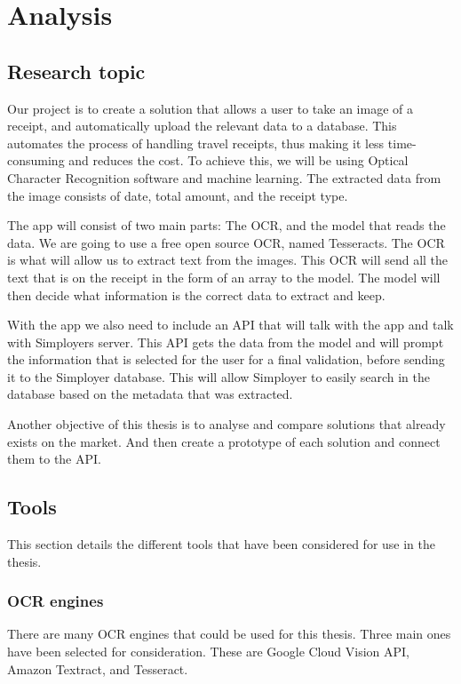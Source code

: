 \cleardoublepage
\chapter{Analysis}
\label{ch:analysis}

\section{Research topic}\label{sec:research-topic}

Our project is to create a solution that allows a user to take an image of a receipt, and automatically upload the
relevant data to a database.
This automates the process of handling travel receipts, thus making it less time-consuming and reduces the cost.
To achieve this, we will be using Optical Character Recognition software and machine learning\@.
The extracted data from the image consists of date, total amount, and the receipt type.

The app will consist of two main parts: The OCR, and the model that reads the data.
We are going to use a free open source OCR, named Tesseracts.
The OCR is what will allow us to extract text from the images.
This OCR will send all the text that is on the receipt in the form of an array to the model.
The model will then decide what information is the correct data to extract and keep.

With the app we also need to include an API that will talk with the app and talk with Simployers server.
This API gets the data from the model and will prompt the information that is selected for the user for a final
validation, before sending it to the Simployer database.
This will allow Simployer to easily search in the database based on the metadata that was extracted.

Another objective of this thesis is to analyse and compare solutions that already exists on the market.
And then create a prototype of each solution and connect them to the API\@.

\section{Tools}\label{sec:tools}
This section details the different tools that have been considered for use in the thesis.
\subsection{OCR engines}\label{subsec:ocr-engines}
There are many OCR engines that could be used for this thesis.
Three main ones have been selected for consideration.
These are Google Cloud Vision API, Amazon Textract, and Tesseract.
